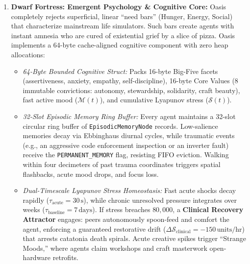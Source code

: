 \begin{enumerate}
    \item \textbf{Dwarf Fortress: Emergent Psychology \& Cognitive Core:} Oasis completely rejects superficial, linear ``need bars'' (Hunger, Energy, Social) that characterize mainstream life simulators. Such bars create agents with instant amnesia who are cured of existential grief by a slice of pizza. Oasis implements a 64-byte cache-aligned cognitive component with zero heap allocations:
    \begin{itemize}
        \item \textit{64-Byte Bounded Cognitive Struct:} Packs 16-byte Big-Five facets (assertiveness, anxiety, empathy, self-discipline), 16-byte Core Values (8 immutable convictions: autonomy, stewardship, solidarity, craft beauty), fast active mood ($\mathcal{M}(t)$), and cumulative Lyapunov stress ($\mathcal{S}(t)$).
        \item \textit{32-Slot Episodic Memory Ring Buffer:} Every agent maintains a 32-slot circular ring buffer of \texttt{EpisodicMemoryNode} records. Low-salience memories decay via Ebbinghaus diurnal cycles, while traumatic events (e.g., an aggressive code enforcement inspection or an inverter fault) receive the \texttt{PERMANENT\_MEMORY} flag, resisting FIFO eviction. Walking within four decimeters of past trauma coordinates triggers spatial flashbacks, acute mood drops, and focus loss.
        \item \textit{Dual-Timescale Lyapunov Stress Homeostasis:} Fast acute shocks decay rapidly ($\tau_{\mathrm{acute}} = 30\,\mathrm{s}$), while chronic unresolved pressure integrates over weeks ($\tau_{\mathrm{baseline}} = 7\,\mathrm{days}$). If stress breaches $80{,}000$, a \textbf{Clinical Recovery Attractor} engages: peers autonomously spoon-feed and comfort the agent, enforcing a guaranteed restorative drift ($\Delta \mathcal{S}_{\mathrm{clinical}} = -150\,\mathrm{units/hr}$) that arrests catatonia death spirals. Acute creative spikes trigger ``Strange Moods,'' where agents claim workshops and craft masterwork open-hardware retrofits.
    \end{itemize}


\end{enumerate}
